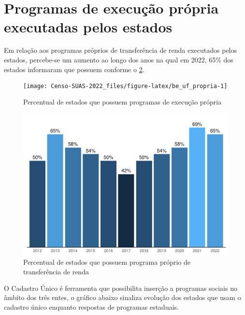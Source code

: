 \documentclass[
  brazilian]{report}
\begin{document}
\hypertarget{programas-de-execuuxe7uxe3o-pruxf3pria-executadas-pelos-estados}{%
\section{Programas de execução própria executadas pelos
estados}\label{programas-de-execuuxe7uxe3o-pruxf3pria-executadas-pelos-estados}}

Em relação aos programas próprios de transferência de renda executados
pelos estados, percebe-se um aumento ao longo dos anos na qual em 2022,
65\% dos estados informaram que possuem conforme o
\cref{fig:be_uf_renda}.

\begin{figure}
\texttt{[image: Censo-SUAS-2022\_files/figure-latex/be\_uf\_propria-1]} \caption[Percentual de estados que possuem programas de execução própria]{Percentual de estados que possuem programas de execução própria}\label{fig:be_uf_propria}
\end{figure}
\begin{figure}
\includegraphics{Censo-SUAS-2022_files/figure-latex/be_uf_renda-1} \caption[Percentual de estados que possuem programa próprio de transferência de renda]{Percentual de estados que possuem programa próprio de transferência de renda}\label{fig:be_uf_renda}
\end{figure}

O Cadastro Único é ferramenta que possibilita inserção a programas
sociais no âmbito dos três entes, o gráfico abaixo sinaliza evolução dos
estados que usam o cadastro único enquanto respostas de programas
estaduais.
\end{document}
